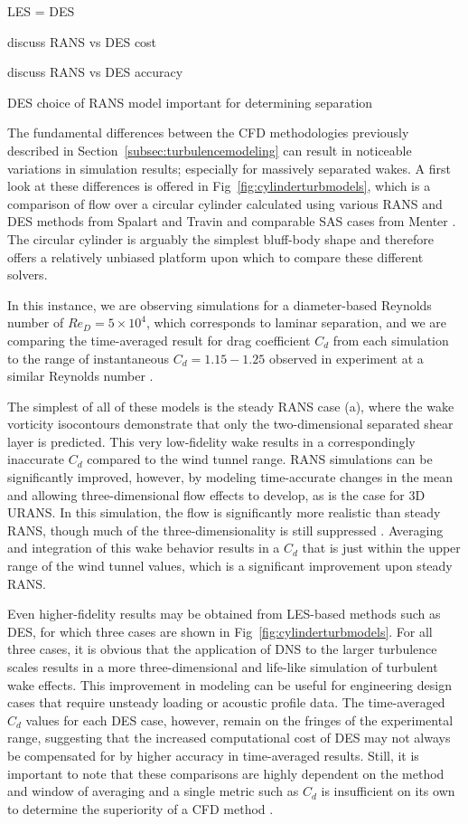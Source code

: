 \documentclass[journal]{new-aiaa}
\begin{document}
LES = DES

discuss RANS vs DES cost

discuss RANS vs DES accuracy

DES choice of RANS model important for determining separation

The fundamental differences between the CFD methodologies previously described in Section~\ref{subsec:turbulencemodeling} can result in noticeable variations in simulation results; especially for massively separated wakes. A first look at these differences is offered in Fig~\ref{fig:cylinderturbmodels}, which is a comparison of flow over a circular cylinder calculated using various RANS and DES methods from Spalart and Travin \cite{spalart2009detachededdy} and comparable SAS cases from Menter \cite{menter2005scaleadaptive}. The circular cylinder is arguably the simplest bluff-body shape and therefore offers a relatively unbiased platform upon which to compare these different solvers.

In this instance, we are observing simulations for a diameter-based Reynolds number of $Re_D = 5 \times 10^4$, which corresponds to laminar separation, and we are comparing the time-averaged result for drag coefficient $C_d$ from each simulation to the range of instantaneous $C_d=1.15-1.25$ observed in experiment at a similar Reynolds number \cite{travin2000detachededdy}.

The simplest of all of these models is the steady RANS case (a), where the wake vorticity isocontours demonstrate that only the two-dimensional separated shear layer is predicted. This very low-fidelity wake results in a correspondingly inaccurate $C_d$ compared to the wind tunnel range. RANS simulations can be significantly improved, however, by modeling time-accurate changes in the mean and allowing three-dimensional flow effects to develop, as is the case for 3D URANS.  In this simulation, the flow is significantly more realistic than steady RANS, though much of the three-dimensionality is still suppressed \cite{spalart2009detachededdy}.  Averaging and integration of this wake behavior results in a $C_d$ that is just within the upper range of the wind tunnel values, which is a significant improvement upon steady RANS.

Even higher-fidelity results may be obtained from LES-based methods such as DES, for which three cases are shown in Fig~\ref{fig:cylinderturbmodels}. For all three cases, it is obvious that the application of DNS to the larger turbulence scales results in a more three-dimensional and life-like simulation of turbulent wake effects. This improvement in modeling can be useful for engineering design cases that require unsteady loading or acoustic profile data. The time-averaged $C_d$ values for each DES case, however, remain on the fringes of the experimental range, suggesting that the increased computational cost of DES may not always be compensated for by higher accuracy in time-averaged results. Still, it is important to note that these comparisons are highly dependent on the method and window of averaging and a single metric such as $C_d$ is insufficient on its own to determine the superiority of a CFD method \cite{travin2000detachededdy}.
\end{document}
